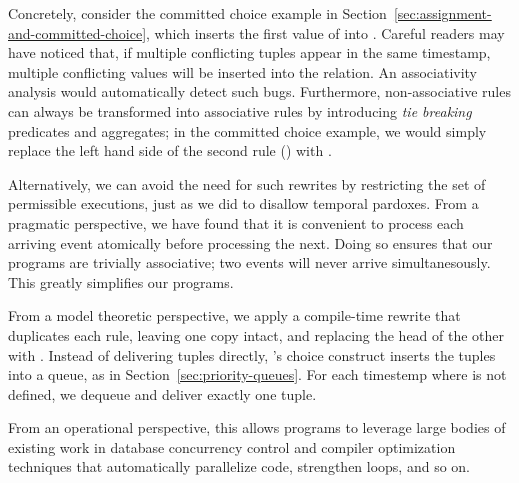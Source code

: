   Concretely, consider the committed choice
example in Section~\ref{sec:assignment-and-committed-choice}, which
inserts the first value of  into .
Careful readers may have noticed that, if multiple conflicting
 tuples appear in the same timestamp, multiple
conflicting values will be inserted into the  relation.
An associativity analysis would automatically detect such bugs.
Furthermore, non-associative rules can always be transformed 
into associative rules by introducing {\em tie breaking} predicates
and aggregates; in the committed choice example, we would simply
replace the left hand side of the second rule
() with .

Alternatively, we can avoid the need for such rewrites by restricting
the set of permissible executions, just as we did to disallow temporal
pardoxes.  From a pragmatic perspective, we have found that it is
convenient to process each arriving event atomically before processing
the next.  Doing so ensures that our programs are trivially
associative; two events will never arrive simultanesously.  This
greatly simplifies our programs.

From a model theoretic perspective, we apply a compile-time rewrite
that duplicates each  rule, leaving one copy intact,
and replacing the head of the other with .
Instead of delivering tuples directly, 's choice
construct inserts the tuples into a queue, as in
Section~\ref{sec:priority-queues}.  For each timestemp 
where  is not defined, we dequeue and deliver
exactly one tuple.

From an operational perspective, this allows \lang programs to
leverage large bodies of existing work in database concurrency control
and compiler optimization techniques that automatically parallelize
code, strengthen loops, and so on.  




